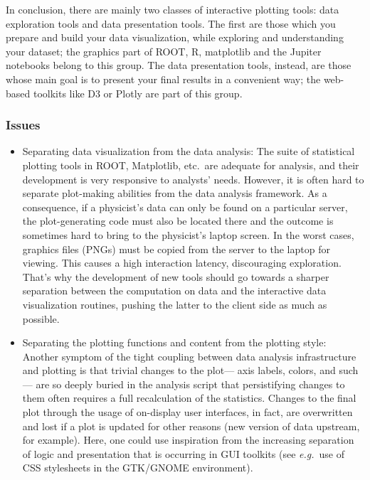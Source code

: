 \documentclass[12pt,a4paper]{article}
\begin{document}
In conclusion, there are mainly two classes of interactive plotting tools: data exploration tools and data presentation tools.
The first are those which you prepare and build your data visualization, while exploring and understanding your dataset;
the graphics part of ROOT, R, matplotlib and the Jupiter notebooks belong to this group. The data presentation tools, instead,
are those whose main goal is to present your final results in a convenient way; the web-based toolkits like D3 or Plotly
are part of this group.

\hypertarget{stats-issues}{%
\subsubsection{Issues}\label{stats-issues}}

\begin{itemize}
\item Separating data visualization from the data analysis:
The suite of statistical plotting tools in ROOT, Matplotlib, etc.\ are adequate for analysis, and their development is
very responsive to analysts’ needs. However, it is often hard to separate plot-making abilities from the data analysis framework.
As a consequence, if a physicist’s data can only be found on a particular server, the plot-generating code must also be located
there and the outcome is sometimes hard to bring to the physicist’s laptop screen. In the worst cases, graphics files (PNGs) must be copied
from the server to the laptop for viewing. This causes a high interaction latency, discouraging exploration. That’s why the
development of new tools should go towards a sharper separation between the computation on data and the interactive data visualization
routines, pushing the latter to the client side as much as possible.

\item Separating the plotting functions and content from the plotting style:
Another symptom of the tight coupling between data analysis infrastructure and plotting is that trivial changes to the plot— axis labels,
colors, and such— are so deeply buried in the analysis script that persistifying changes to them often requires a full recalculation
of the statistics. Changes to the final plot through the usage of on-display user interfaces, in fact, are overwritten and lost if a
plot is updated for other reasons (new version of data upstream, for example). Here, one could use inspiration from the increasing
separation of logic and presentation that is occurring in GUI toolkits (see {\it e.g.}\ use of CSS stylesheets in the GTK/GNOME environment).
\end{itemize}
\end{document}

